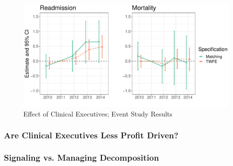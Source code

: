 \documentclass[12pt]{article}
\begin{document}
\begin{figure}[ht!]
    \centering
    \includegraphics[width=.99\linewidth]{Objects/main_twfe_match_eventstudy.pdf}
    \caption{Effect of Clinical Executives; Event Study Results}
    \label{fig:main_twfe_match_es}
\end{figure}



\subsubsection{Are Clinical Executives Less Profit Driven?}

\subsubsection{Signaling vs. Managing Decomposition}



    

    

    

    

    

    

	
	
	
\end{document}
